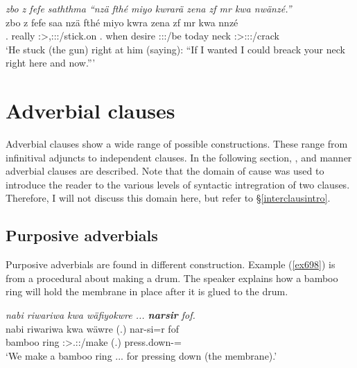 \begin{exe}
	\ex \emph{zbo z fefe saththma ``nzä fthé miyo kwrarä zena zf mr kwa nwänzé.''}\\
	\gll zbo z fefe saa nzä fthé miyo kwra zena zf mr kwa nnzé\\
	\Prox.{\All} {\Imm} really \Stsg:\Sbj>\Tsg,\Masc:\Io:\Pst:\Pfv/stick.on \Fsg.{\Abs} when desire \Fsg:\Sbj:\Irr:\Ipfv/be today {\Imm} neck {\Fut} \Fsg:\Sbj>\Ssg:\Obj:\Nonpast:\Ipfv/crack\\
	\trans `He stuck (the gun) right at him (saying): ``If I wanted I could breack your neck right here and now.'''
	\label{ex684}
\end{exe}

\section{Adverbial clauses}\label{advclauses}

Adverbial clauses show a wide range of possible constructions. These range from infinitival adjuncts to independent clauses. In the following section, ,  and manner adverbial clauses are described. Note that the domain of cause was used to introduce the reader to the various levels of syntactic intregration of two clauses. Therefore, I will not discuss this domain here, but refer to {\S}\ref{interclausintro}.

\subsection{Purposive adverbials}\label{purposeadverbials}

Purposive adverbials are found in different construction. Example (\ref{ex698})	is from a procedural about making a drum. The speaker explains how a bamboo ring will hold the membrane in place after it is glued to the drum.

\begin{exe}
	\ex \emph{nabi riwariwa kwa wäfiyokwre ... \textbf{narsir} fof.}\\
	\gll nabi riwariwa kwa wäwre (.) nar-si=r fof\\
	bamboo ring {\Fut} \Fpl:\Sbj>\Tsg.\F:\Nonpast:\Ipfv/make (.) press.down-\Nmlz={\Purp} \Emph\\
	\trans `We make a bamboo ring ... for pressing down (the membrane).'\\
	\label{ex698}
\end{exe}

